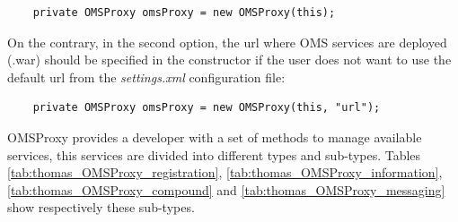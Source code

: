 \begin{lstlisting}
	private OMSProxy omsProxy = new OMSProxy(this);
\end{lstlisting}

On the contrary, in the second option, the url where OMS services are deployed (.war) should be specified in the constructor if the user does not want to use the default url from the \textit{settings.xml} configuration file:

\begin{lstlisting}
	private OMSProxy omsProxy = new OMSProxy(this, "url");
\end{lstlisting}


OMSProxy provides a developer with a set of methods to manage available services, this services are divided into different types and sub-types.
 Tables \ref{tab:thomas_OMSProxy_registration}, \ref{tab:thomas_OMSProxy_information}, \ref{tab:thomas_OMSProxy_compound} and \ref{tab:thomas_OMSProxy_messaging} show respectively these sub-types.





